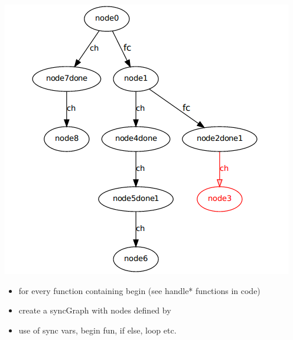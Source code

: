 \documentclass[12pt]{beamer}
\begin{document}
\begin{frame}[plain]
  \includegraphics[scale=0.3]{p1.png}
  \begin{itemize}
  \item for every function containing begin (see handle* functions in code) 
  \item create a syncGraph with nodes defined by
  \item use of sync vars, begin fun, if else, loop etc.
  
  \end{itemize}
\end{frame}
\end{document}
